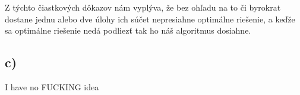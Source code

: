 \documentclass[a4paper]{article}
\begin{document}
Z týchto čiastkových dôkazov nám vyplýva, že bez ohľadu na to či byrokrat dostane jednu alebo dve úlohy ich súčet nepresiahne optimálne riešenie, a keďže sa optimálne riešenie nedá podliezť tak ho náš algoritmus dosiahne.

\subsection*{c)}

I have no FUCKING idea
\end{document}
